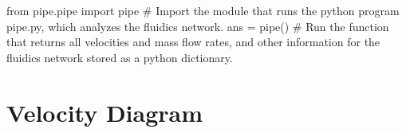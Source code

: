 \documentclass[12pt, oneside]{article}   	%
\begin{document}
\begin{pycode}

from pipe.pipe import pipe # Import the module that runs the python program pipe.py, which analyzes the fluidics network.
ans = pipe() # Run the function that returns all velocities and mass flow rates, and other information for the fluidics network stored as a python dictionary.

\end{pycode}

\section{Velocity Diagram}

\hspace*{-1.3in} %
\end{document}
